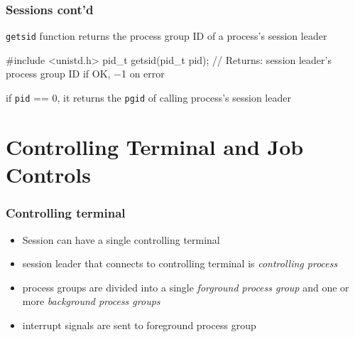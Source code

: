 \documentclass[newPxFont,sthlmFooter,nooffset]{beamer}
\begin{document}
\begin{frame}[fragile,t]
  \frametitle{Sessions cont'd}
\texttt{getsid} function returns the process group ID of a process's session leader

\begin{codedef}
#include <unistd.h> 
pid_t getsid(pid_t pid);
// Returns: session leader’s process group ID if OK, −1 on error  
\end{codedef}

if \texttt{pid} == 0, it returns the \texttt{pgid} of calling process's session leader
\end{frame}



\section{Controlling Terminal and Job Controls}

\begin{frame}[t]
  \frametitle{Controlling terminal}
\begin{itemize}
\item Session can have a single controlling terminal
\item session leader that connects to controlling terminal is \textit{controlling process}
\item process groups are divided into a single \textit{forground process group} and one or more \textit{background process groups}
\item interrupt signals are sent to foreground process group
\end{itemize}
\end{frame}
\end{document}
